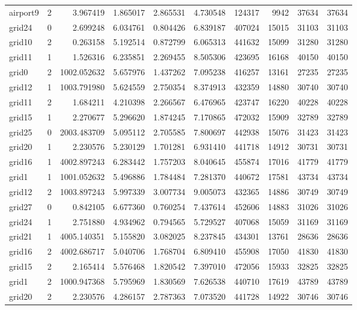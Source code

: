 \begin{longtable}{|l|r|r|r|r|r|r|r|r|r|}
airport9 & 2 & 3.967419 & 1.865017 & 2.865531 & 4.730548 & 124317 & 9942 & 37634 & 37634 \\
grid24 & 0 & 2.699248 & 6.034761 & 0.804426 & 6.839187 & 407024 & 15015 & 31103 & 31103 \\
grid10 & 2 & 0.263158 & 5.192514 & 0.872799 & 6.065313 & 441632 & 15099 & 31280 & 31280 \\
grid11 & 1 & 1.526316 & 6.235851 & 2.269455 & 8.505306 & 423695 & 16168 & 40150 & 40150 \\
grid0 & 2 & 1002.052632 & 5.657976 & 1.437262 & 7.095238 & 416257 & 13161 & 27235 & 27235 \\
grid12 & 1 & 1003.791980 & 5.624559 & 2.750354 & 8.374913 & 432359 & 14880 & 30740 & 30740 \\
grid11 & 2 & 1.684211 & 4.210398 & 2.266567 & 6.476965 & 423747 & 16220 & 40228 & 40228 \\
grid15 & 1 & 2.270677 & 5.296620 & 1.874245 & 7.170865 & 472032 & 15909 & 32789 & 32789 \\
grid25 & 0 & 2003.483709 & 5.095112 & 2.705585 & 7.800697 & 442938 & 15076 & 31423 & 31423 \\
grid20 & 1 & 2.230576 & 5.230129 & 1.701281 & 6.931410 & 441718 & 14912 & 30731 & 30731 \\
grid16 & 1 & 4002.897243 & 6.283442 & 1.757203 & 8.040645 & 455874 & 17016 & 41779 & 41779 \\
grid1 & 1 & 1001.052632 & 5.496886 & 1.784484 & 7.281370 & 440672 & 17581 & 43734 & 43734 \\
grid12 & 2 & 1003.897243 & 5.997339 & 3.007734 & 9.005073 & 432365 & 14886 & 30749 & 30749 \\
grid27 & 0 & 0.842105 & 6.677360 & 0.760254 & 7.437614 & 452606 & 14883 & 31026 & 31026 \\
grid24 & 1 & 2.751880 & 4.934962 & 0.794565 & 5.729527 & 407068 & 15059 & 31169 & 31169 \\
grid21 & 1 & 4005.140351 & 5.155820 & 3.082025 & 8.237845 & 434301 & 13761 & 28636 & 28636 \\
grid16 & 2 & 4002.686717 & 5.040706 & 1.768704 & 6.809410 & 455908 & 17050 & 41830 & 41830 \\
grid15 & 2 & 2.165414 & 5.576468 & 1.820542 & 7.397010 & 472056 & 15933 & 32825 & 32825 \\
grid1 & 2 & 1000.947368 & 5.795969 & 1.830569 & 7.626538 & 440710 & 17619 & 43789 & 43789 \\
grid20 & 2 & 2.230576 & 4.286157 & 2.787363 & 7.073520 & 441728 & 14922 & 30746 & 30746 \\

\end{longtable}
